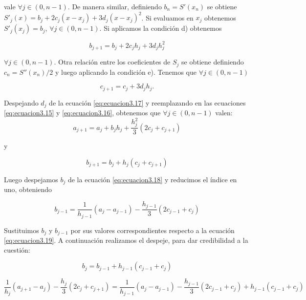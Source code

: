 vale $\forall j \in (0, n-1)$. De manera similar, definiendo $b_{n} = S'(x_{n})$ se obtiene $S'_{j}(x) = b_{j} + 2c_{j} (x - x_{j}) + 3d_{j} (x - x_{j})^{2}$.
Si evaluamos en $x_{j}$ obtenemos  $S'_{j}(x_{j}) = b_{j}$, $\forall j \in (0, n-1)$. Si aplicamos la condición d) obtenemos

\begin{equation} \label{eq:ecuacion3.16}
b_{j+1} = b_{j} + 2c_{j} h_{j} + 3d_{j} h_{j}^{2}
\end{equation}

$\forall j \in (0, n-1)$. Otra relación entre los coeficientes de $S_{j}$ se obtiene definiendo $c_{n} = S''(x_{n})/2$ y luego aplicando la condición e). Tenemos que $\forall j \in (0, n-1)$ 

\begin{equation} \label{eq:ecuacion3.17}
c_{j+1} = c_{j} + 3d_{j} h_{j}.
\end{equation}

Despejando $d_{j}$ de la ecuación \ref{eq:ecuacion3.17} y reemplazando en las ecuaciones \ref{eq:ecuacion3.15} y \ref{eq:ecuacion3.16}, obtenemos que $\forall j \in (0, n-1)$ valen:\\

\begin{equation} \label{eq:ecuacion3.18}
a_{j+1} = a_{j} + b_{j} h_{j} + \frac{h_{j}^{2}}{3} (2c_{j} + c_{j+1})
\end{equation}
\begin{center} y \end{center}
\begin{equation} \label{eq:ecuacion3.19}
b_{j+1} = b_{j} + h_{j} (c_{j} + c_{j+1})
\end{equation}


Luego despejamos $b_{j}$ de la ecuación \ref{eq:ecuacion3.18} y reducimos el índice en uno, obteniendo 

\begin{equation} \label{eq:ecuacion3.20}
b_{j-1} = \frac{1}{h_{j-1}} (a_{j} - a_{j-1}) - \frac{h_{j-1}}{3} (2c_{j-1} + c_{j})                                
\end{equation}

Sustituimos $b_{j}$ y $b_{j-1}$ por sus valores correspondientes respecto a la ecuación \ref{eq:ecuacion3.19}. A continuación realizamos el despeje, para dar credibilidad a la cuestión:

$$b_{j} = b_{j-1} + h_{j-1} (c_{j-1} + c_{j})$$

$$\frac{1}{h_{j}} (a_{j+1} - a_{j}) - \frac{h_{j}}{3} (2c_{j} + c_{j+1}) = \frac{1}{h_{j-1}} (a_{j} - a_{j-1}) - \frac{h_{j-1}}{3} (2c_{j-1} + c_{j}) + h_{j-1} (c_{j-1} + c_{j})$$

